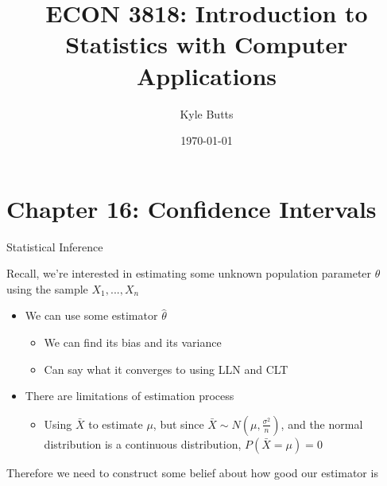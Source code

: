 \documentclass{beamer}
\title{ECON 3818: Introduction to Statistics with Computer Applications}
\date{\today}
\author{Kyle Butts}
\begin{document}
\maketitle




\section{Chapter 16: Confidence Intervals}
\begin{frame}{Statistical Inference}
	
	Recall, we're interested in estimating some unknown population parameter $\theta$ using the sample $X_1, ...,X_n$
	\begin{itemize}
		\item We can use some estimator $\hat{\theta}$
		      \begin{itemize}
		      	\item We can find its bias and its variance
		      	\item Can say what it converges to using LLN and CLT
		      \end{itemize}
		\item There are limitations of estimation process
		      \begin{itemize}
		      	\item Using $\bar{X}$ to estimate $\mu$, but since $\bar{X} \sim N(\mu, \frac{\sigma^2}{n})$, and the normal distribution is a continuous distribution, $P(\bar{X}=\mu)=0$
		      \end{itemize}
	\end{itemize}
	Therefore we need to construct some belief about how good our estimator is
	
\end{frame}


\end{document}
